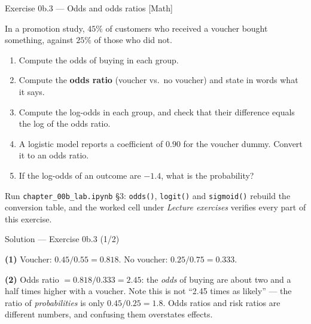 \documentclass[aspectratio=169,11pt]{beamer}
\begin{document}
\begin{frame}{Exercise 0b.3 --- Odds and odds ratios [Math]}
  \begin{exercise}
    In a promotion study, $45\%$ of customers who received a voucher bought
    something, against $25\%$ of those who did not.
    \begin{enumerate}
      \item Compute the odds of buying in each group.
      \item Compute the \textbf{odds ratio} (voucher vs.\ no voucher) and state
            in words what it says.
      \item Compute the log-odds in each group, and check that their
            difference equals the log of the odds ratio.
      \item A logistic model reports a coefficient of $0.90$ for the voucher
            dummy. Convert it to an odds ratio.
      \item If the log-odds of an outcome are $-1.4$, what is the probability?
    \end{enumerate}
  \end{exercise}
  \begin{labnote}
    Run \texttt{chapter\_00b\_lab.ipynb} \S3: \texttt{odds()}, \texttt{logit()}
    and \texttt{sigmoid()} rebuild the conversion table, and the worked cell
    under \emph{Lecture exercises} verifies every part of this exercise.
  \end{labnote}
\end{frame}

\begin{frame}{Solution --- Exercise 0b.3 (1/2)}
  \begin{solutionbox}
    \textbf{(1)} Voucher: $0.45/0.55 = \mathbf{0.818}$. No voucher:
    $0.25/0.75 = \mathbf{0.333}$.

    \textbf{(2)} Odds ratio $= 0.818/0.333 = \mathbf{2.45}$: the \emph{odds} of
    buying are about two and a half times higher with a voucher. Note this is
    not ``2.45 times as likely'' --- the ratio of \emph{probabilities} is only
    $0.45/0.25 = 1.8$. Odds ratios and risk ratios are different numbers, and
    confusing them overstates effects.
  \end{solutionbox}
\end{frame}
\end{document}
